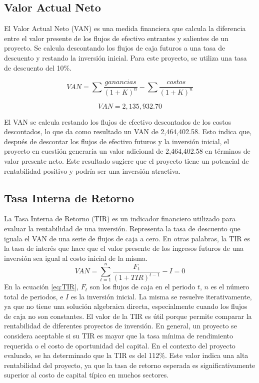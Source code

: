 \subsection{Valor Actual Neto}
El Valor Actual Neto (VAN) es una medida financiera que calcula la diferencia entre el valor presente de los flujos de efectivo entrantes y salientes de un proyecto. Se calcula descontando los flujos de caja futuros a una tasa de descuento y restando la inversión inicial. Para este proyecto, se utiliza una tasa de descuento del 10\%. 

\begin{equation}
    \label{eq:VAN}
    VAN = \sum \frac{ganancias}{(1+K)^{n}} - \sum \frac{costos}{(1+K)^{n}}
\end{equation}

\begin{equation*}
    VAN =  2,135,932.70
\end{equation*}

El VAN se calcula restando los flujos de efectivo descontados de los costos descontados, lo que da como resultado un VAN de 2,464,402.58. Esto indica que, después de descontar los flujos de efectivo futuros y la inversión inicial, el proyecto en cuestión generaría un valor adicional de 2,464,402.58 en términos de valor presente neto. Este resultado sugiere que el proyecto tiene un potencial de rentabilidad positivo y podría ser una inversión atractiva.

\subsection{Tasa Interna de Retorno}
La Tasa Interna de Retorno (TIR) es un indicador financiero utilizado para evaluar la rentabilidad de una inversión. Representa la tasa de descuento que iguala el VAN de una serie de flujos de caja a cero. En otras palabras, la TIR es la tasa de interés que hace que el valor presente de los ingresos futuros de una inversión sea igual al costo inicial de la misma.
\begin{equation}
    \label{eq:TIR}
    VAN = \sum_{t=1}^{n} \frac{F_t}{(1+TIR)^{t-1}} - I = 0
\end{equation}
\indent
En la ecuación \ref{eq:TIR}, $F_t$ son los flujos de caja en el periodo $t$, $n$ es el número total de periodos, e $I$ es la inversión inicial. La misma se resuelve iterativamente, ya que no tiene una solución algebraica directa, especialmente cuando los flujos de caja no son constantes. El valor de la TIR es útil porque permite comparar la rentabilidad de diferentes proyectos de inversión. En general, un proyecto se considera aceptable si su TIR es mayor que la tasa mínima de rendimiento requerida o el costo de oportunidad del capital. En el contexto del proyecto evaluado, se ha determinado que la TIR es del 112\%. Este valor indica una alta rentabilidad del proyecto, ya que la tasa de retorno esperada es significativamente superior al costo de capital típico en muchos sectores.

